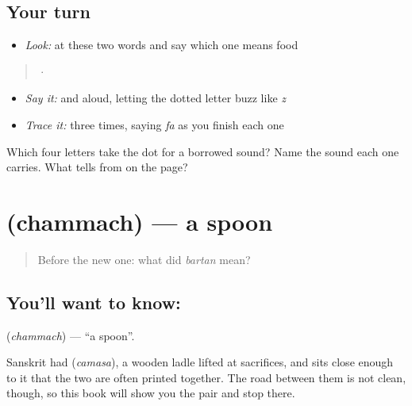 \subsection*{Your turn}
\begin{itemize}
\raggedright
  \item \emph{Look:} at these two words and say which one means food
\end{itemize}

\begin{quote}
  ·  
\end{quote}

\begin{itemize}
\raggedright
  \item \emph{Say it:}  and  aloud, letting the dotted letter buzz like \emph{z}
  \item \emph{Trace it:}  three times, saying \emph{fa} as you finish each one
\end{itemize}

\begin{tcolorbox}[breakable,colback=teal!4,colframe=teal!35!black,title={Before you move on}]
Which four letters take the dot for a borrowed sound? Name the sound each one carries. What tells \textbf{} from \textbf{} on the page?
\end{tcolorbox}
\section[\texorpdfstring{\hi{चम्मच} (chammach)}{चम्मच (chammach)}]{ (chammach) — a spoon}

\label{lesson:HI-C61-spoon}



\begin{quote}
Before the new one: what did \emph{bartan} mean?
\end{quote}

\subsection*{You'll want to know: }
\textbf{} (\emph{chammach}) — \textquotedblleft{}a spoon\textquotedblright{}.

Sanskrit had  (\emph{camasa}), a wooden ladle lifted at sacrifices, and  sits close enough to it that the two are often printed together. The road between them is not clean, though, so this book will show you the pair and stop there.

